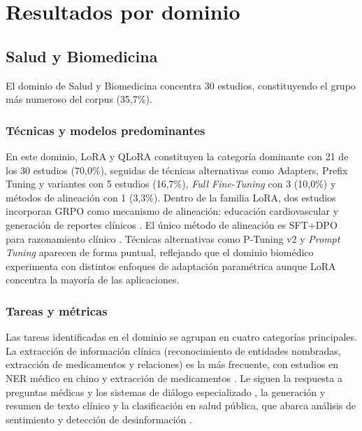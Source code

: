 \section{Resultados por dominio}

\subsection{Salud y Biomedicina}

El dominio de Salud y Biomedicina concentra 30 estudios, constituyendo el grupo más numeroso del corpus (35,7\%).

\subsubsection{Técnicas y modelos predominantes}

En este dominio, LoRA y QLoRA constituyen la categoría dominante con 21 de los 30 estudios (70,0\%), seguidas de técnicas alternativas como Adapters, Prefix Tuning y variantes con 5 estudios (16,7\%), \textit{Full Fine-Tuning} con 3 (10,0\%) y métodos de alineación con 1 (3,3\%). Dentro de la familia LoRA, dos estudios incorporan GRPO como mecanismo de alineación: educación cardiovascular \parencite{rullo2025cardio} y generación de reportes clínicos \parencite{kuo2025medical}. El único método de alineación es SFT+DPO para razonamiento clínico \parencite{savage2025dpo}. Técnicas alternativas como P-Tuning v2 \parencite{liu2024cpmi} y \textit{Prompt Tuning} \parencite{yang2025ceprompt} aparecen de forma puntual, reflejando que el dominio biomédico experimenta con distintos enfoques de adaptación paramétrica aunque LoRA concentra la mayoría de las aplicaciones.

\subsubsection{Tareas y métricas}

Las tareas identificadas en el dominio se agrupan en cuatro categorías principales. La extracción de información clínica (reconocimiento de entidades nombradas, extracción de medicamentos y relaciones) es la más frecuente, con estudios en NER médico en chino \parencite{zhou2024adapter} y extracción de medicamentos \parencite{richterpechanski2025medication}. Le siguen la respuesta a preguntas médicas y los sistemas de diálogo especializado \parencite{adhikary2025medical, bayram2025medical, tong2025xuanhugpt}, la generación y resumen de texto clínico \parencite{chao2025evaluating, hou2024ft} y la clasificación en salud pública, que abarca análisis de sentimiento \parencite{elmitwalli2024ft} y detección de desinformación \parencite{zhao2025daft}.

